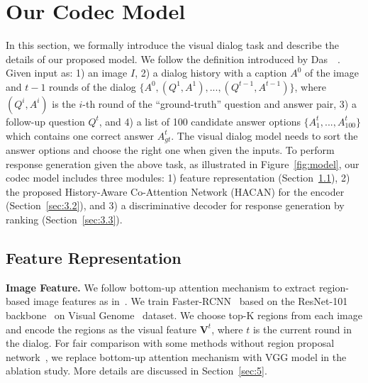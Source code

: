 \documentclass[10pt,twocolumn,letterpaper]{article}
\begin{document}
\section{Our Codec Model}\label{sec3}
In this section, we formally introduce the visual dialog task and describe the details of our proposed model. We follow the definition introduced by Das~\etal~\cite{das2017visual}. Given input as: 1) an image $I$, 2) a dialog history with a caption $A^0$ of the image and $t\!-\!1$ rounds of the dialog  $\{A^0,(Q^{1},A^{1}),...,(Q^{t-1},A^{t-1})\}$, where $(Q^{i},A^{i})$ is the $i$-th round of the ``ground-truth'' question and answer pair, 3) a follow-up question $Q^{t}$, and 4) a list of 100 candidate answer options $\{{A^{t}_{1}},...,{A^{t}_{100}}\}$ which contains one correct answer $A^{t}_{gt}$. The visual dialog model needs to sort the answer options and choose the right one when given the inputs. To perform response generation given the above task, as illustrated in Figure~\ref{fig:model}, our codec model includes three modules: 1) feature representation (Section~\ref{sec:3.1}), 2) the proposed History-Aware Co-Attention Network (HACAN) for the encoder (Section~\ref{sec:3.2}), and 3) a discriminative decoder for response generation by ranking (Section~\ref{sec:3.3}). 
\subsection{Feature Representation}\label{sec:3.1}

\noindent\textbf{Image Feature.} We follow bottom-up attention mechanism to extract region-based image features as in~\cite{anderson2017bottom}. 
We train Faster-RCNN~\cite{ren2015faster} based on the ResNet-101 backbone~\cite{he2016deep} on Visual Genome~\cite{krishna2017visual} dataset. We choose top-K regions from each image and encode the regions as the visual feature $\bm{V}^t$, where $t$ is the current round in the dialog. For fair comparison with some methods without region proposal network~\cite{ren2015faster}, we replace bottom-up attention mechanism with VGG model in the ablation study. More details are discussed in Section~\ref{sec:5}.
\end{document}
